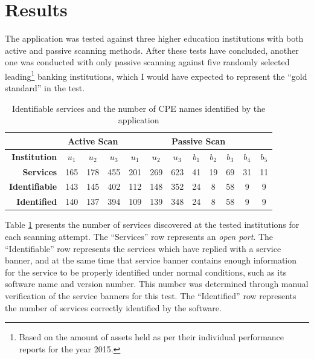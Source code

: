 \documentclass[a4paper,12pt]{article}
\begin{document}
\section{Results}
 

	The application was tested against three higher education institutions with both active and passive scanning methods. After these tests have concluded, another one was conducted with only passive scanning against five randomly selected leading\footnote{Based on the amount of assets held as per their individual performance reports for the year 2015.} banking institutions, which I would have expected to represent the ``gold standard'' in the test.

	\begin{table}[H]
		\centering
		\begin{tabular}{r|ccc|ccc|ccccc|}
			\cline{2-12}
			\multicolumn{1}{l|}{}                         & \multicolumn{3}{c|}{\textbf{Active Scan}} & \multicolumn{8}{c|}{\textbf{Passive Scan}}                                                             \\ \hline
			\multicolumn{1}{|r|}{\textbf{Institution}}      & \textbf{$u_1$}    & \textbf{$u_2$}    & \textbf{$u_3$}   & \textbf{$u_1$} & \textbf{$u_2$} & \textbf{$u_3$} & \textbf{$b_1$} & \textbf{$b_2$} & \textbf{$b_3$} & \textbf{$b_4$} & \textbf{$b_5$} \\ \hline
			\multicolumn{1}{|r|}{\textbf{Services}} & 165            & 178            & 455           & 201         & 269         & 623         & 41          & 19          & 69          & 31          & 11          \\
			\multicolumn{1}{|r|}{\textbf{Identifiable}} & 143            & 145            & 402           & 112         & 148         & 352         & 24          & 8           & 58          & 9           & 9           \\
			\multicolumn{1}{|r|}{\textbf{Identified}}   & 140            & 137            & 394           & 109         & 139         & 348         & 24          & 8           & 58          & 9           & 9           \\ \hline
		\end{tabular}
		\caption{Identifiable services and the number of CPE names identified by the application}
		\label{cpeids}
	\end{table}
	
	Table \ref{cpeids} presents the number of services discovered at the tested institutions for each scanning attempt. The ``Services'' row represents an \textit{open port}. The ``Identifiable'' row represents the services which have replied with a service banner, and at the same time that service banner contains enough information for the service to be properly identified under normal conditions, such as its software name and version number. This number was determined through manual verification of the service banners for this test. The ``Identified'' row represents the number of services correctly identified by the software.
	
\end{document}
